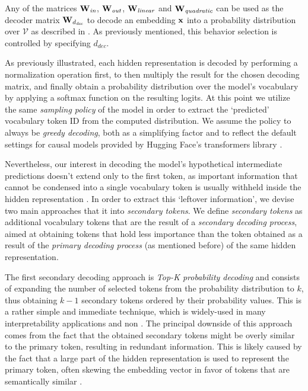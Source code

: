     Any of the matrices $\bm{\mathbf{W}}_\textit{in}$, $\bm{\mathbf{W}}_\textit{out}$, $\bm{\mathbf{W}}_\textit{linear}$ and $\bm{\mathbf{W}}_\textit{quadratic}$ can be used as the decoder matrix $\bm{\mathbf{W}}_{d_\textit{dec}}$ to decode an embedding $\bm{\mathbf{x}}$ into a probability distribution over $\mathcal{V}$ as described in .
    As previously mentioned, this behavior selection is controlled by specifying $d_\textit{dec}$.
    
    As previously illustrated, each hidden representation is decoded by performing a normalization operation first, to then multiply the result for the chosen decoding matrix, and finally obtain a probability distribution over the model's vocabulary by applying a softmax function on the resulting logits.
    At this point we utilize the same \emph{sampling policy} of the model in order to extract the `predicted' vocabulary token ID from the computed distribution.
    We assume the policy to always be \emph{greedy decoding}, both as a simplifying factor and to reflect the default settings for causal models provided by Hugging Face's transformers library .

    Nevertheless, our interest in decoding the model's hypothetical intermediate predictions doesn't extend only to the first token, as important information that cannot be condensed into a single vocabulary token is usually withheld inside the hidden representation .
    In order to extract this `leftover information', we devise two main approaches that  it into \emph{secondary tokens}.
    We define \emph{secondary tokens} as additional vocabulary tokens that are the result of a \emph{secondary decoding process}, aimed at obtaining tokens that hold less importance than the token obtained as a result of the \emph{primary decoding process} (as mentioned before) of the same hidden representation.

    The first secondary decoding approach is \emph{Top-K probability decoding} and consists of expanding the number of selected tokens from the probability distribution to $k$, thus obtaining $k-1$ secondary tokens ordered by their probability values.
    This is a rather simple and immediate technique, which is widely-used in many interpretability applications and non .
    The principal downside of this approach comes from the fact that the obtained secondary tokens might be overly similar to the primary token, resulting in redundant information.
    This is likely caused by the fact that a large part of the hidden representation is used to represent the primary token, often skewing the embedding vector in favor of tokens that are semantically similar .

